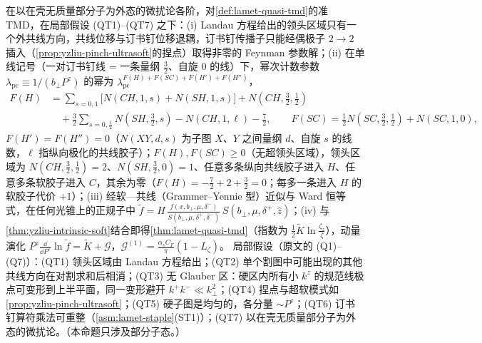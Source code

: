 \begin{proposition}\label{prop:yzliu-qtmd-powercount}
在以在壳无质量部分子为外态的微扰论各阶，对\cref{def:lamet-quasi-tmd}的准 TMD，在局部假设 (QT1)--(QT7) 之下：(i) Landau 方程给出的领头区域只有一个外共线方向，共线位移与订书钉位移退耦，订书钉传播子只能经偶极子 $2\to2$ 插入（\cref{prop:yzliu-pinch-ultrasoft}的捏点）取得非零的 Feynman 参数解；(ii) 在单线记号（一对订书钉线 = 一条量纲 $\frac32$、自旋 $0$ 的线）下，幂次计数参数 $\lambda_{\mathrm{pc}}\equiv1/(b_\perp P^z)$ 的幂为 $\lambda_{\mathrm{pc}}^{F(H)+F(SC)+F(H')+F(H'')}$，%
\begin{equation}\label{eq:yzliu-FH}
\begin{aligned}
F(H)&=\sum_{s=0,1}\big[N(CH,1,s)+N(SH,1,s)\big]+N(CH,\tfrac32,\tfrac12)\\
&\quad+\tfrac32\sum_{s=0,\frac12}N(SH,\tfrac32,s)-N(CH,1,\ell)-\tfrac72 ,\qquad F(SC)=\tfrac12N(SC,\tfrac32,\tfrac12)+N(SC,1,0),
\end{aligned}
\end{equation}
$F(H')=F(H'')=0$（$N(XY,d,s)$ 为子图 $X$、$Y$ 之间量纲 $d$、自旋 $s$ 的线数，$\ell$ 指纵向极化的共线胶子）；$F(H),F(SC)\ge0$（无超领头区域），领头区域为 $N(CH,\frac32,\frac12)=2$、$N(SH,\frac32,0)=1$、任意多条纵向共线胶子进入 $H$、任意多条软胶子进入 $C$，其余为零（$F(H)=-\frac72+2+\frac32=0$；每多一条进入 $H$ 的软胶子代价 $+1$）；(iii) 经软—共线（Grammer--Yennie 型）近似与 Ward 恒等式，在任何光锥上的正规子中 $\tilde f=H\,\frac{f(x,b_\perp,\mu,\delta^-)}{S(b_\perp,\mu,\delta^+,\delta^-)}\,S(b_\perp,\mu,\delta^+,\hat z)$\cite[式~(74)]{Liu:2022nnk}；(iv) 与\cref{thm:yzliu-intrinsic-soft}结合即得\cref{thm:lamet-quasi-tmd}（指数为 $\frac12\tilde K\ln\frac{\zeta_z}{\zeta}$），动量演化 $P^z\frac{\dd}{\dd P^z}\ln\tilde f=\tilde K+\mathcal G$，$\mathcal G^{(1)}=\frac{\alpha_sC_F}{\pi}(1-L_\zeta)$。%
局部假设（原文的 (Q1)--(Q7)）：(QT1) 领头区域由 Landau 方程给出；(QT2) 单个割图中可能出现的其他共线方向在对割求和后相消；(QT3) 无 Glauber 区：硬区内所有小 $k^z$ 的规范线极点可变形到上半平面，同一变形避开 $k^+k^-\ll k_\perp^2$；(QT4) 捏点与超软模式如\cref{prop:yzliu-pinch-ultrasoft}；(QT5) 硬子图是均匀的，各分量 $\sim P^z$；(QT6) 订书钉算符乘法可重整（\cref{asm:lamet-staple}(ST1)）；(QT7) 以在壳无质量部分子为外态的微扰论。（本命题只涉及部分子态。）
\end{proposition}

